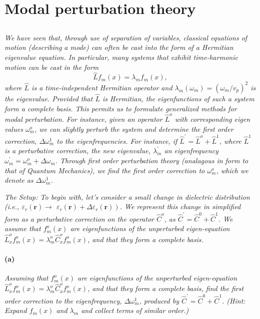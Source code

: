 \documentclass[hyperref, a4paper]{article}
\begin{document}
\section{Modal perturbation theory}

\subsection{}

\textit{
    We have seen that, through use of separation of variables, classical equations of motion (describing a mode) can often be cast into the form of a Hermitian eigenvalue equation. In particular, many systems that exhibit time-harmonic motion can be cast in the form
    $$
    \hat{L} f_m(x)=\lambda_m f_m(x),
    $$
    where $\hat{L}$ is a time-independent Hermitian operator and $\lambda_m\left(\omega_m\right)=\left(\omega_m / v_p\right)^2$ is the eigenvalue. Provided that $\hat{L}$ is Hermitian, the eigenfunctions of such a system form a complete basis. This permits us to formulate generalized methods for modal perturbation. For instance, given an operator $\hat{L}^o$ with corresponding eigen values $\omega_m^o$, we can slightly perturb the system and determine the first order correction, $\Delta \omega_m^1$ to the eigenfrequencies. For instance, if $\hat{L}^{\prime}=\hat{L}^o+\hat{L}^1$, where $\hat{L}^1$ is a perturbative correction, the new eigenvalue, $\lambda_m^{\prime}$ an eigenfrequency $\omega_m^{\prime}=\omega_m^o+\Delta \omega_m$. Through first order perturbation theory (analagous in form to that of Quantum Mechanics), we find the first order correction to $\omega_m^o$, which we denote as $\Delta \omega_m^1$.
}

\textit{The Setup: To begin with, let's consider a small change in dielectric distribution (i.e., $\varepsilon_r(\mathbf{r}) \rightarrow$ $\left.\varepsilon_r(\mathbf{r})+\Delta \varepsilon_r(\mathbf{r})\right)$. We represent this change in simplified form as a perturbative correction on the operator $\hat{C}^o$, as $\hat{C}^{\prime}=\hat{C}^0+\hat{C}^1$. We assume that $f_m^o(x)$ are eigenfunctions of the unperturbed eigen-equation $\hat{L}_x^o f_m^o(x)=\lambda_m^o \hat{C}_x^o f_m^o(x)$, and that they form a complete basis.}

\paragraph*{(a)} \textit{Assuming that $f_m^o(x)$ are eigenfunctions of the unperturbed eigen-equation $\hat{L}_x^o f_m^o(x)=\lambda_m^o \hat{C}_x^o f_m^o(x)$, and that they form a complete basis, find the first order correction to the eigenfrequency, $\Delta \omega_m^1$, produced by $\hat{C}^{\prime}=\hat{C}^0+\hat{C}^1$. (Hint: Expand $f_m(x)$ and $\lambda_m$ and collect terms of similar order.)}
\end{document}
